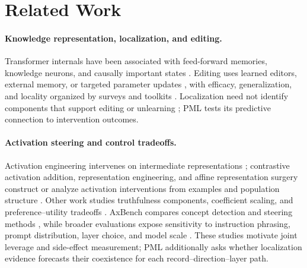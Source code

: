 \section{Related Work}

\paragraph{Knowledge representation, localization, and editing.}
Transformer internals have been associated with feed-forward memories,
knowledge neurons, and causally important states
\citep{geva-etal-2021-transformer,dai-etal-2022-knowledge,
NEURIPS2022_6f1d43d5}. Editing uses learned editors, external memory, or
targeted parameter updates
\citep{de-cao-etal-2021-editing,mitchell2022fast,mitchell22a,meng2023mass}, with
efficacy, generalization, and locality organized by surveys and toolkits
\citep{yao-etal-2023-editing,wang-etal-2024-easyedit}.
Localization need not identify components that support editing or unlearning
\citep{NEURIPS2023_3927bbdc,lee-etal-2025-localization}; PML tests its predictive
connection to intervention outcomes.

\paragraph{Activation steering and control tradeoffs.}
Activation engineering intervenes on intermediate representations
\citep{turner2023steering}; contrastive activation addition, representation
engineering, and affine representation surgery construct or analyze
activation interventions from examples and population structure
\citep{rimsky-etal-2024-steering,zou2023representation,pmlr-v235-singh24d}.
Other work studies truthfulness components, coefficient scaling, and
preference--utility tradeoffs
\citep{NEURIPS2023_81b83900,stoehr-etal-2024-activation,
xu-etal-2026-steering}. AxBench compares concept detection and steering methods
\citep{wu25a}, while broader evaluations expose sensitivity to instruction
phrasing, prompt distribution, layer choice, and model scale
\citep{tan2024steering,silva-etal-2025-steering,
goyal-iii-2026-steering}. These studies motivate joint leverage and side-effect
measurement; PML additionally asks whether localization evidence forecasts
their coexistence for each record--direction--layer path.

